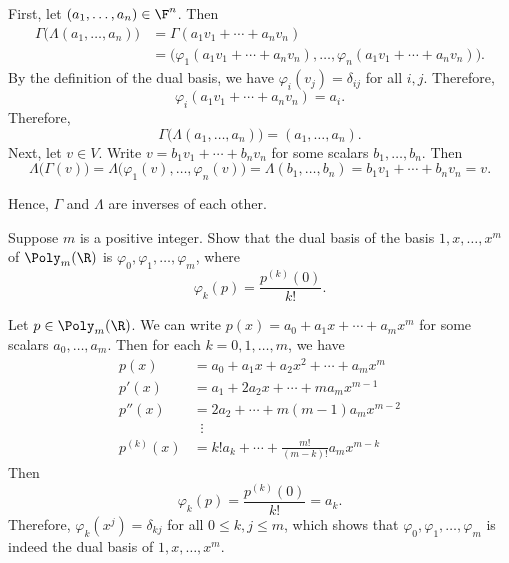 \begin{exc}
\begin{solution}
First, let $(a_1,\dots,a_n)\in\F^n$. Then
\begin{align*}
\Gamma\bigl(\Lambda(a_1,\dots,a_n)\bigr) &= \Gamma(a_1v_1+\cdots+a_nv_n)\\
 &= \bigl(\varphi_1(a_1v_1+\cdots+a_nv_n),\dots,
    \varphi_n(a_1v_1+\cdots+a_nv_n)\bigr).
\end{align*}
By the definition of the dual basis, we have $\varphi_i(v_j)=\delta_{ij}$ for all
$i,j$. Therefore,
\[ \varphi_i(a_1v_1+\cdots+a_nv_n) = a_i. \]
Therefore,
\[ \Gamma\bigl(\Lambda(a_1,\dots,a_n)\bigr) = (a_1,\dots,a_n). \]
Next, let $v\in V$. Write $v=b_1v_1+\cdots+b_nv_n$ for some scalars
$b_1,\dots,b_n$. Then
\[ \Lambda\bigl(\Gamma(v)\bigr) = \Lambda\bigl(\varphi_1(v),\dots,\varphi_n(v)\bigr)
   = \Lambda(b_1,\dots,b_n) = b_1v_1+\cdots+b_nv_n = v. \]

Hence, $\Gamma$ and $\Lambda$ are inverses of each other.
\end{solution}

\begin{exercise}
Suppose $m$ is a positive integer. Show that the dual basis of the basis
$1,x,\dots,x^m$ of $\Poly_m(\R)$ is $\varphi_0,\varphi_1,\dots,\varphi_m$, where
\[ \varphi_k(p) = \frac{p^{(k)}(0)}{k!}. \]
\end{exercise}
\begin{solution}
Let $p\in\Poly_m(\R)$. We can write $p(x)=a_0+a_1x+\cdots+a_mx^m$ for some
scalars $a_0,\dots,a_m$. Then for each $k=0,1,\dots,m$, we have
\begin{align*}
p(x) &= a_0+a_1x+a_2x^2+\cdots+a_mx^m\\
p'(x) &= a_1+2a_2x+\cdots+ma_mx^{m-1}\\
p''(x) &= 2a_2+\cdots+m(m-1)a_mx^{m-2}\\
&\;\;\vdots\\
p^{(k)}(x) &= k!a_k+\cdots+\frac{m!}{(m-k)!}a_mx^{m-k}
\end{align*}
Then
\[ \varphi_k(p) = \frac{p^{(k)}(0)}{k!} = a_k. \]
Therefore, $\varphi_k(x^j)=\delta_{kj}$ for all $0\le k,j\le m$, which shows
that $\varphi_0,\varphi_1,\dots,\varphi_m$ is indeed the dual basis of
$1,x,\dots,x^m$.
\end{solution}


\end{exc}
